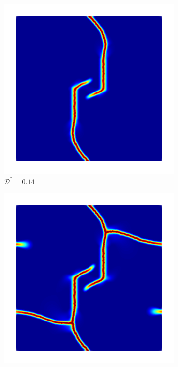 \begin{figure}[htb!]
  \begin{subfigure}[b]{0.23\textwidth}
    \centering
    \includegraphics[width=\textwidth,scale=0.5]{Chapter4/figures/biaxial_odd_1.png}
    \caption{$\mathcal{D}^* = 0.14$}
    \label{fig: Chapter4/biaxial_odd_1}
  \end{subfigure}
  \hspace{0.03\textwidth}
  \begin{subfigure}[b]{0.23\textwidth}
    \centering
    \includegraphics[width=\textwidth,scale=0.5]{Chapter4/figures/biaxial_odd_2.png}

\end{subfigure}
\end{figure}
